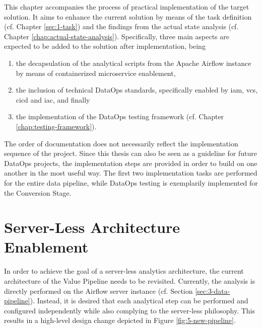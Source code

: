 
This chapter accompanies the process of practical implementation of the target solution. It aims to enhance the current solution by means of the task definition (cf. Chapter \ref{sec:1-task}) and the findings from the actual state analysis (cf. Chapter \ref{chap:actual-state-analysis}). Specifically, three main aspects are expected to be added to the solution after implementation, being

\begin{enumerate}
	\item the decapsulation of the analytical scripts from the Apache Airflow instance by means of containerized microservice enablement,
	\item the inclusion of technical DataOps standards, specifically enabled by \acs{iam}, \ac{vcs}, \ac{cicd} and \ac{iac}, and finally
	\item the implementation of the DataOps testing framework (cf. Chapter \ref{chap:testing-framework}).
\end{enumerate}

The order of documentation does not necessarily reflect the implementation sequence of the project. Since this thesis can also be seen as a guideline for future DataOps projects, the implementation steps are provided in order to build on one another in the most useful way. The first two implementation tasks are performed for the entire data pipeline, while DataOps testing is exemplarily implemented for the Conversion Stage.

\section{Server-Less Architecture Enablement}
In order to achieve the goal of a server-less analytics architecture, the current architecture of the Value Pipeline needs to be revisited. Currently, the analysis is directly performed on the Airflow server instance (cf. Section \ref{sec:3-data-pipeline}). Instead, it is desired that each analytical step can be performed and configured independently while also complying to the server-less philosophy. This results in a high-level design change depicted in Figure \ref{fig:5-new-pipeline}.
\newpage

